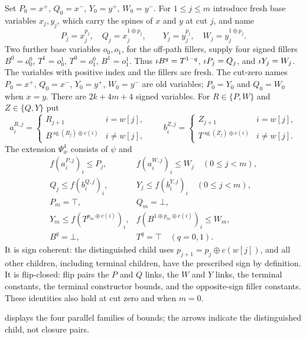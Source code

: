 Set
$P_0=x^+$, $Q_0=x^-$, $Y_0=y^+$, $W_0=y^-$.
For $1\le j\le m$ introduce fresh base variables $x_j,y_j$, which carry the
spines of $x$ and $y$ at cut $j$, and name
\[
 P_j=x_j^{p_j},\quad Q_j=x_j^{1\oplus p_j},\qquad
 Y_j=y_j^{p_j},\quad W_j=y_j^{1\oplus p_j}.
\]
Two further base variables $o_0,o_1$, for the off-path fillers, supply four
signed fillers
$B^0=o_0^0$, $T^1=o_0^1$, $T^0=o_1^0$, $B^1=o_1^1$.
Thus $\iota B^q=T^{1-q}$, $\iota P_j=Q_j$, and $\iota Y_j=W_j$.
The variables with positive index and the fillers are fresh. The cut-zero
names $P_0=x^+$, $Q_0=x^-$, $Y_0=y^+$, $W_0=y^-$ are old variables;
$P_0=Y_0$ and $Q_0=W_0$ when $x=y$.
There are $2k+4m+4$ signed variables.
For $R\in\{P,W\}$ and $Z\in\{Q,Y\}$ put
\[
 a^{R,j}_i=\begin{cases}R_{j+1}&i=w[j],\\B^{\operatorname{sg}(R_j)\oplus c(i)}&i\ne w[j],\end{cases}
 \qquad
 b^{Z,j}_i=\begin{cases}Z_{j+1}&i=w[j],\\T^{\operatorname{sg}(Z_j)\oplus c(i)}&i\ne w[j].\end{cases}
\]
The extension $\Psi^4_w$ consists of $\psi$ and
\begin{equation}\label{eq:g28}
\begin{array}{ll}
 f(a^{P,j}_i)_i\le P_j,&f(a^{W,j}_i)_i\le W_j\quad(0\le j<m),\\
 Q_j\le f(b^{Q,j}_i)_i,&Y_j\le f(b^{Y,j}_i)_i\quad(0\le j<m),\\
 P_m=\top,&Q_m=\bot,\\
 Y_m\le f(T^{p_m\oplus c(i)})_i,&f(B^{1\oplus p_m\oplus c(i)})_i\le W_m,\\
 B^q=\bot,&T^q=\top\quad(q=0,1).
\end{array}
\end{equation}
It is sign coherent: the distinguished child uses
$p_{j+1}=p_j\oplus c(w[j])$, and all other children, including terminal
children, have the prescribed sign by definition. It is flip-closed:
flip pairs the $P$ and $Q$ links, the $W$ and $Y$ links, the terminal
constants, the terminal constructor bounds, and the opposite-sign filler
constants. These identities also hold at cut zero and when $m=0$.

 displays the four parallel families of bounds;
the arrows indicate the distinguished child, not closure pairs.


